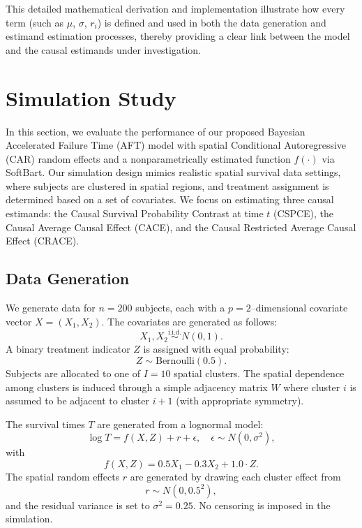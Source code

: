 \documentclass[useAMS,referee]{biom}
\begin{document}
This detailed mathematical derivation and implementation illustrate how every term (such as \(\mu\), \(\sigma\), \(r_i\)) is defined and used in both the data generation and estimand estimation processes, thereby providing a clear link between the model and the causal estimands under investigation.






\section{Simulation Study}

In this section, we evaluate the performance of our proposed Bayesian Accelerated Failure Time (AFT) model with spatial Conditional Autoregressive (CAR) random effects and a nonparametrically estimated function \( f(\cdot) \) via SoftBart. Our simulation design mimics realistic spatial survival data settings, where subjects are clustered in spatial regions, and treatment assignment is determined based on a set of covariates. We focus on estimating three causal estimands: the Causal Survival Probability Contrast at time \( t \) (CSPCE), the Causal Average Causal Effect (CACE), and the Causal Restricted Average Causal Effect (CRACE).

\subsection{Data Generation}

We generate data for \( n = 200 \) subjects, each with a \( p = 2 \)–dimensional covariate vector \( X = (X_1, X_2) \). The covariates are generated as follows:
\[
X_1, X_2 \stackrel{\text{i.i.d.}}{\sim} N(0,1).
\]
A binary treatment indicator \( Z \) is assigned with equal probability:
\[
Z \sim \text{Bernoulli}(0.5).
\]
Subjects are allocated to one of \( I = 10 \) spatial clusters. The spatial dependence among clusters is induced through a simple adjacency matrix \( W \) where cluster \( i \) is assumed to be adjacent to cluster \( i+1 \) (with appropriate symmetry).

The survival times \( T \) are generated from a lognormal model:
\[
\log T = f(X,Z) + r + \epsilon, \quad \epsilon \sim N(0, \sigma^2),
\]
with
\[
f(X,Z) = 0.5 X_1 - 0.3 X_2 + 1.0 \cdot Z.
\]
The spatial random effects \( r \) are generated by drawing each cluster effect from
\[
r \sim N(0, 0.5^2),
\]
and the residual variance is set to \( \sigma^2 = 0.25 \). No censoring is imposed in the simulation.
\end{document}
